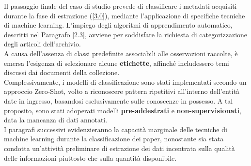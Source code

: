 Il passaggio finale del caso di studio prevede di classificare i metadati acquisiti durante la fase di estrazione (\ref{3.0}), mediante l'applicazione di specifiche tecniche di machine learning. L'impiego degli algoritmi di apprendimento automatico, descritti nel Paragrafo \ref{2.3}, avviene per soddisfare la richiesta di categorizzazione degli articoli dell'archivio. \vspace{7pt} \\
A causa dell'assenza di classi predefinite associabili alle osservazioni raccolte, è emersa l'esigenza di selezionare alcune \textbf{etichette}, affinché includessero temi discussi dai documenti della collezione. \vspace{7pt} \\
Complessivamente, i modelli di classificazione sono stati implementati secondo un approccio Zero-Shot, volto a riconoscere pattern ripetitivi all'interno dell'entità date in ingresso, basandosi esclusivamente sulle conoscenze in possesso. A tal proposito, sono stati adoperati modelli \textbf{pre-addestrati} e \textbf{non-supervisionati}, data la mancanza di dati annotati. \vspace{7pt}\\
I paragrafi successivi evidenzieranno la capacità marginale delle tecniche di machine learning durante la classificazione dei paper, nonostante sia stata condotta un'attività preliminare di estrazione dei dati incentrata sulla qualità delle informazioni piuttosto che sulla quantità disponibile.